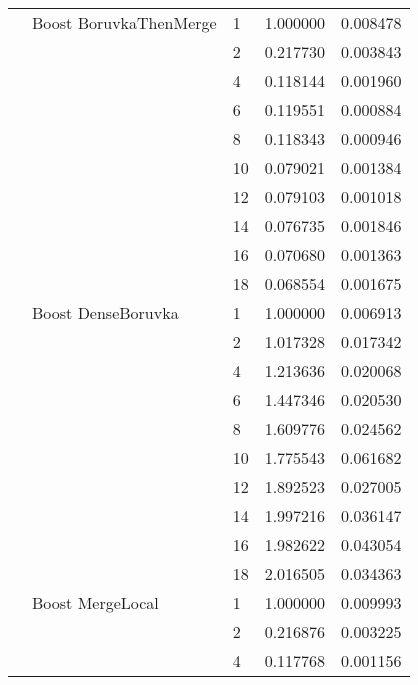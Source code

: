 \begin{tabular}{lllrr}
                      & Boost BoruvkaThenMerge & 1  &  1.000000 &  0.008478 \\
                      &                     & 2  &  0.217730 &  0.003843 \\
                      &                     & 4  &  0.118144 &  0.001960 \\
                      &                     & 6  &  0.119551 &  0.000884 \\
                      &                     & 8  &  0.118343 &  0.000946 \\
                      &                     & 10 &  0.079021 &  0.001384 \\
                      &                     & 12 &  0.079103 &  0.001018 \\
                      &                     & 14 &  0.076735 &  0.001846 \\
                      &                     & 16 &  0.070680 &  0.001363 \\
                      &                     & 18 &  0.068554 &  0.001675 \\
                      & Boost DenseBoruvka & 1  &  1.000000 &  0.006913 \\
                      &                     & 2  &  1.017328 &  0.017342 \\
                      &                     & 4  &  1.213636 &  0.020068 \\
                      &                     & 6  &  1.447346 &  0.020530 \\
                      &                     & 8  &  1.609776 &  0.024562 \\
                      &                     & 10 &  1.775543 &  0.061682 \\
                      &                     & 12 &  1.892523 &  0.027005 \\
                      &                     & 14 &  1.997216 &  0.036147 \\
                      &                     & 16 &  1.982622 &  0.043054 \\
                      &                     & 18 &  2.016505 &  0.034363 \\
                      & Boost MergeLocal & 1  &  1.000000 &  0.009993 \\
                      &                     & 2  &  0.216876 &  0.003225 \\
                      &                     & 4  &  0.117768 &  0.001156 \\

\end{tabular}
